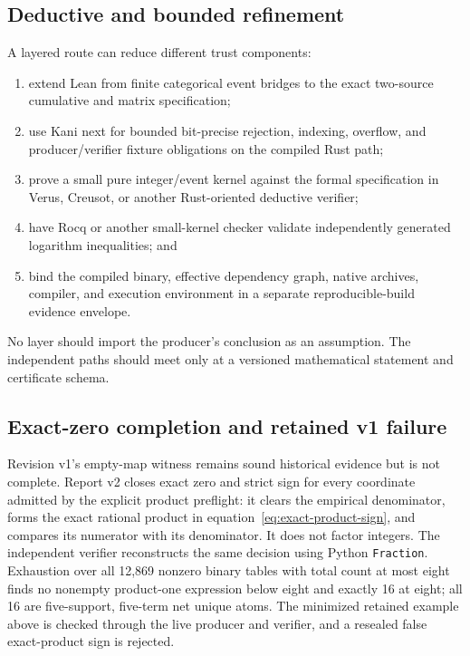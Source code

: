 \documentclass[11pt]{article}
\theoremstyle{definition}
\begin{document}
\subsection{Deductive and bounded refinement}

A layered route can reduce different trust components:
\begin{enumerate}[leftmargin=*]
  \item extend Lean from finite categorical event bridges to the exact two-source cumulative and
  matrix specification;
  \item use Kani next for bounded bit-precise rejection, indexing, overflow, and producer/verifier
  fixture obligations on the compiled Rust path;
  \item prove a small pure integer/event kernel against the formal specification in Verus,
  Creusot, or another Rust-oriented deductive verifier;
  \item have Rocq or another small-kernel checker validate independently generated logarithm
  inequalities; and
  \item bind the compiled binary, effective dependency graph, native archives, compiler, and
  execution environment in a separate reproducible-build evidence envelope.
\end{enumerate}

No layer should import the producer's conclusion as an assumption.  The independent paths should
meet only at a versioned mathematical statement and certificate schema.

\subsection{Exact-zero completion and retained v1 failure}

Revision v1's empty-map witness remains sound historical evidence but is not complete.  Report v2
closes exact zero and strict sign for every coordinate admitted by the explicit product preflight:
it clears the empirical denominator, forms the exact rational product in
equation~\eqref{eq:exact-product-sign}, and compares its numerator with its denominator.  It does
not factor integers.  The independent verifier reconstructs the same decision using Python
\texttt{Fraction}.  Exhaustion over all 12,869 nonzero binary tables with total count at most eight
finds no nonempty product-one expression below eight and exactly 16 at eight; all 16 are
five-support, five-term net unique atoms.  The minimized retained example above is checked through
the live producer and verifier, and a resealed false exact-product sign is rejected.
\end{document}

